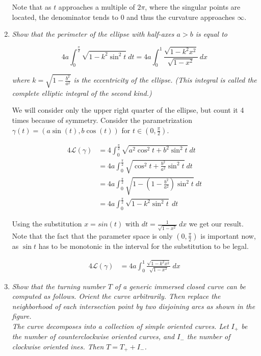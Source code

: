 \documentclass[a4paper,11pt,notitlepage,fullpage]{article}
\begin{document}
\begin{enumerate}
Note that as $t$ approaches a multiple of $2\pi$, where the singular points are located, the denominator tends to $0$ and thus the curvature approaches $\infty$.



\item \emph{Show that the perimeter of the ellipse with half-axes $a>b$ is equal to }

\begin{equation*}
4a \int_0^\frac{\pi}{2} \sqrt{1 - k^2 \sin^2t} ~dt = 4a \int_0^1 \frac{\sqrt{1 - k^2 x^2}}{\sqrt{1 - x^2}} ~dx
\end{equation*}

\emph{where $k = \sqrt{1 - \frac{b^2}{a^2}}$ is the eccentricity of the ellipse. (This integral is called the complete elliptic integral of the second kind.)}

We will consider only the upper right quarter of the ellipse, but count it 4 times because of symmetry. Consider the parametrization $\gamma(t) = (a \sin(t), b \cos(t))$ for $t \in (0, \frac{\pi}{2})$.

\begin{align*}
4 \mathcal L(\gamma) &= 4 \int_0^\frac{\pi}{2} \sqrt{a^2 \cos^2t + b^2\sin^2t} ~dt \\
&= 4a \int_0^\frac{\pi}{2} \sqrt{\cos^2t + \frac{b^2}{a^2}\sin^2t} ~dt \\
&= 4a \int_0^\frac{\pi}{2} \sqrt{1 - \left(1 - \frac{b^2}{a^2}\right)\sin^2t} ~dt \\
&= 4a \int_0^\frac{\pi}{2} \sqrt{1 - k^2 \sin^2t} ~dt 
\end{align*}

Using the substitution $x = sin(t)$ with $dt = \frac{1}{\sqrt{1-x^2}} ~dx$ we get our result. Note that the fact that the parameter space is only $(0, \frac{\pi}{2})$ is important now, as $\sin t$ has to be monotonic in the interval for the substitution to be legal. 

\begin{align*}
4 \mathcal L(\gamma) &= 4a \int_0^1 \frac{\sqrt{1 - k^2 x^2}}{\sqrt{1 - x^2}} ~dx
\end{align*}



\item \emph{Show that the turning number $T$ of a generic immersed closed curve can be computed as follows. Orient the curve arbitrarily. Then replace the neighborhood of each intersection point by two disjoining arcs as shown in the figure. \\ The curve decomposes into a collection of simple oriented curves. Let $I_+$ be the number of counterclockwise oriented curves, and $I_-$ the number of clockwise oriented ines. Then $T = T_+ + I_-$.}


\end{enumerate}
\end{document}

